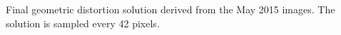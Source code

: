 Final geometric distortion solution derived from the May 2015 images.  The solution is sampled every 42 pixels. \label{fig:May_dist_quiver}